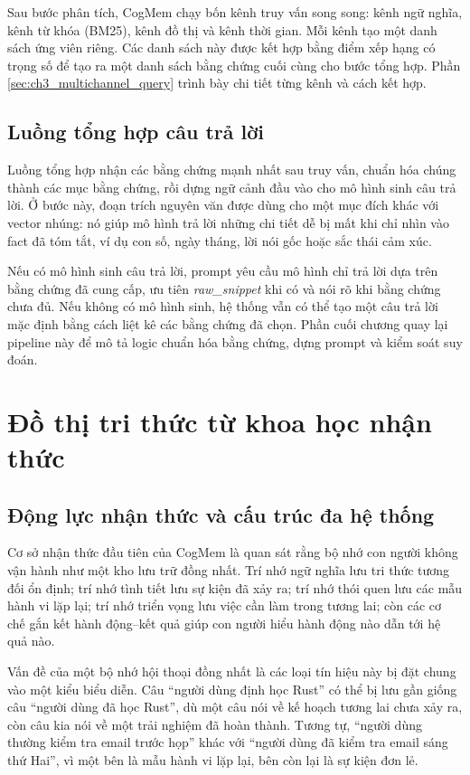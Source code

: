 \documentclass[../main.tex]{subfiles}
\begin{document}
Sau bước phân tích, CogMem chạy bốn kênh truy vấn song song: kênh ngữ nghĩa, kênh từ khóa (BM25), kênh đồ thị và kênh thời gian. Mỗi kênh tạo một danh sách ứng viên riêng. Các danh sách này được kết hợp bằng điểm xếp hạng có trọng số để tạo ra một danh sách bằng chứng cuối cùng cho bước tổng hợp. Phần \ref{sec:ch3_multichannel_query} trình bày chi tiết từng kênh và cách kết hợp.

\subsection{Luồng tổng hợp câu trả lời}

Luồng tổng hợp nhận các bằng chứng mạnh nhất sau truy vấn, chuẩn hóa chúng thành các mục bằng chứng, rồi dựng ngữ cảnh đầu vào cho mô hình sinh câu trả lời. Ở bước này, đoạn trích nguyên văn được dùng cho một mục đích khác với vector nhúng: nó giúp mô hình trả lời những chi tiết dễ bị mất khi chỉ nhìn vào fact đã tóm tắt, ví dụ con số, ngày tháng, lời nói gốc hoặc sắc thái cảm xúc.

Nếu có mô hình sinh câu trả lời, prompt yêu cầu mô hình chỉ trả lời dựa trên bằng chứng đã cung cấp, ưu tiên \textit{raw\_snippet} khi có và nói rõ khi bằng chứng chưa đủ. Nếu không có mô hình sinh, hệ thống vẫn có thể tạo một câu trả lời mặc định bằng cách liệt kê các bằng chứng đã chọn. Phần cuối chương quay lại pipeline này để mô tả logic chuẩn hóa bằng chứng, dựng prompt và kiểm soát suy đoán.

\section{Đồ thị tri thức từ khoa học nhận thức}

\subsection{Động lực nhận thức và cấu trúc đa hệ thống}

Cơ sở nhận thức đầu tiên của CogMem là quan sát rằng bộ nhớ con người không vận hành như một kho lưu trữ đồng nhất. Trí nhớ ngữ nghĩa lưu tri thức tương đối ổn định; trí nhớ tình tiết lưu sự kiện đã xảy ra; trí nhớ thói quen lưu các mẫu hành vi lặp lại; trí nhớ triển vọng lưu việc cần làm trong tương lai; còn các cơ chế gắn kết hành động--kết quả giúp con người hiểu hành động nào dẫn tới hệ quả nào.

Vấn đề của một bộ nhớ hội thoại đồng nhất là các loại tín hiệu này bị đặt chung vào một kiểu biểu diễn. Câu ``người dùng định học Rust'' có thể bị lưu gần giống câu ``người dùng đã học Rust'', dù một câu nói về kế hoạch tương lai chưa xảy ra, còn câu kia nói về một trải nghiệm đã hoàn thành. Tương tự, ``người dùng thường kiểm tra email trước họp'' khác với ``người dùng đã kiểm tra email sáng thứ Hai'', vì một bên là mẫu hành vi lặp lại, bên còn lại là sự kiện đơn lẻ.
\end{document}
